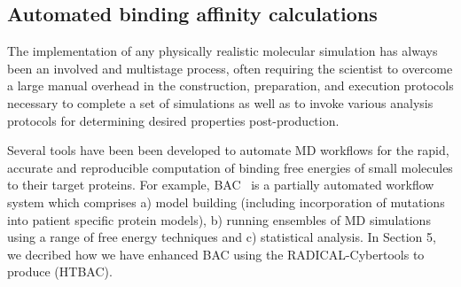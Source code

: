 
\subsection{Automated binding affinity calculations}


The implementation of any physically realistic molecular simulation has
always been an involved and multistage process, often requiring the scientist
to overcome a large manual overhead in the construction, preparation, and
execution protocols necessary to complete a set of simulations as well as to
invoke various analysis protocols for determining desired properties
post-production.

Several tools have been been developed to automate MD workflows for the rapid,
accurate and reproducible computation of binding free energies of small
molecules to their target proteins. For example, BAC~\cite{Sadiq2008} is a
partially automated workflow system which comprises a) model building (including
incorporation of mutations into patient specific protein models), b) running
ensembles of MD simulations using a range of free energy techniques and c)
statistical analysis. In Section 5, we decribed how we have enhanced BAC using the RADICAL-Cybertools to produce (HTBAC).





